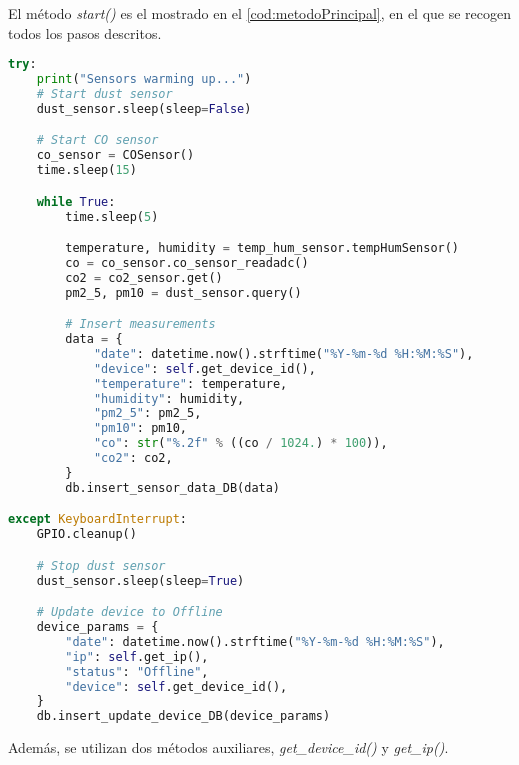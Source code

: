 El método \textit{start()} es el mostrado en el \autoref{cod:metodoPrincipal}, en el que se recogen todos los pasos descritos.
\pagebreak

\begin{lstlisting}[language=Python, label=cod:metodoPrincipal, caption=Método start del programa principal]
try:
    print("Sensors warming up...")
    # Start dust sensor
    dust_sensor.sleep(sleep=False)

    # Start CO sensor
    co_sensor = COSensor()
    time.sleep(15)

    while True:
        time.sleep(5)

        temperature, humidity = temp_hum_sensor.tempHumSensor()
        co = co_sensor.co_sensor_readadc()
        co2 = co2_sensor.get()
        pm2_5, pm10 = dust_sensor.query()

        # Insert measurements
        data = {
            "date": datetime.now().strftime("%Y-%m-%d %H:%M:%S"),
            "device": self.get_device_id(),
            "temperature": temperature,
            "humidity": humidity,
            "pm2_5": pm2_5,
            "pm10": pm10,
            "co": str("%.2f" % ((co / 1024.) * 100)),
            "co2": co2,
        }
        db.insert_sensor_data_DB(data)

except KeyboardInterrupt:
    GPIO.cleanup()

    # Stop dust sensor
    dust_sensor.sleep(sleep=True)

    # Update device to Offline
    device_params = {
        "date": datetime.now().strftime("%Y-%m-%d %H:%M:%S"),
        "ip": self.get_ip(),
        "status": "Offline",
        "device": self.get_device_id(),
    }
    db.insert_update_device_DB(device_params)
\end{lstlisting}
\pagebreak

Además, se utilizan dos métodos auxiliares, \textit{get\_device\_id()} y \textit{get\_ip()}.  


